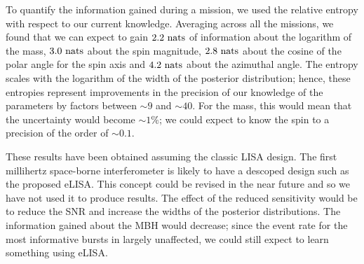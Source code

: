 To quantify the information gained during a mission, we used the relative entropy with respect to our current knowledge. Averaging across all the missions, we found that we can expect to gain $2.2~\mathrm{nats}$ of information about the logarithm of the mass, $3.0~\mathrm{nats}$ about the spin magnitude, $2.8~\mathrm{nats}$ about the cosine of the polar angle for the spin axis and $4.2~\mathrm{nats}$ about the azimuthal angle. The entropy scales with the logarithm of the width of the posterior distribution; hence, these entropies represent improvements in the precision of our knowledge of the parameters by factors between $\sim9$ and $\sim40$. For the mass, this would mean that the uncertainty would become $\sim1\%$; we could expect to know the spin to a precision of the order of $\sim0.1$.

These results have been obtained assuming the classic LISA design. The first millihertz space-borne interferometer is likely to have a descoped design such as the proposed eLISA. This concept could be revised in the near future and so we have not used it to produce results. The effect of the reduced sensitivity would be to reduce the SNR and increase the widths of the posterior distributions. The information gained about the MBH would decrease; since the event rate for the most informative bursts in largely unaffected, we could still expect to learn something using eLISA.

